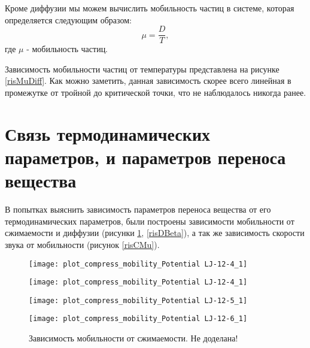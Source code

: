 Кроме диффузии мы можем вычислить мобильность частиц в системе, которая определяется следующим образом:
\begin{equation}
    \mu  = \frac{D}{T},
    \label{eqMuDiff}
\end{equation}
где $\mu$ - мобильность частиц.


Зависимость мобильности частиц от температуры представлена на рисунке \ref{risMuDiff}.
Как можно заметить, данная зависимость скорее всего линейная в промежутке от тройной до критической точки, что не наблюдалось никогда ранее.

\section{Связь термодинамических параметров, и параметров переноса вещества}\label{C3_2}

В попытках выяснить зависимость параметров переноса вещества от его термодинамических параметров, были построены зависимости мобильности от сжимаемости и диффузии (рисунки \ref{risMuBeta}, \ref{risDBeta}), а так же зависимость скорости звука от мобильности (рисунок \ref{risCMu}).

\begin{figure}[h]
\begin{center}
\begin{minipage}[h]{0.45\linewidth}
\texttt{[image: plot\_compress\_mobility\_Potential LJ-12-4\_1]}
\end{minipage}
\begin{minipage}[h]{0.45\linewidth}
\texttt{[image: plot\_compress\_mobility\_Potential LJ-12-4\_1]}
\end{minipage}

\begin{minipage}[h]{0.45\linewidth}
\texttt{[image: plot\_compress\_mobility\_Potential LJ-12-5\_1]}
\end{minipage}
\begin{minipage}[h]{0.45\linewidth}
\texttt{[image: plot\_compress\_mobility\_Potential LJ-12-6\_1]}
\end{minipage}
\caption{Зависимость мобильности от сжимаемости. Не доделана!}
\label{risMuBeta}
\end{center}
\end{figure}


